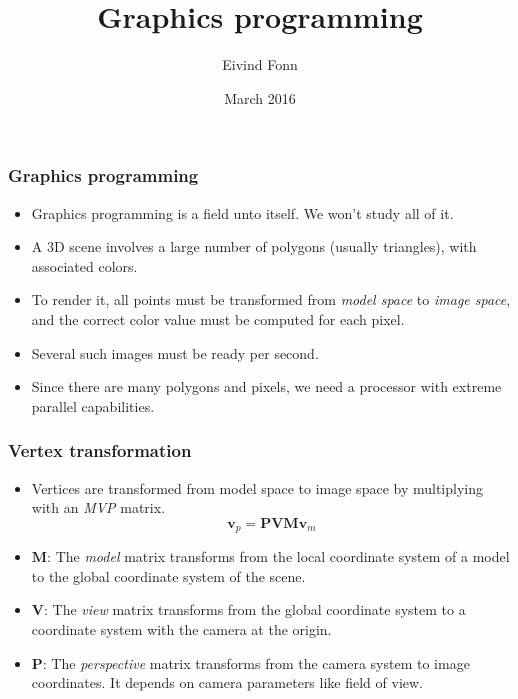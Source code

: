 

\title{Graphics programming}
\author{Eivind Fonn}
\date{March 2016}
\maketitle

\begin{frame}
  \frametitle{Graphics programming}
  \begin{itemize}
  \item Graphics programming is a field unto itself. We won't study all of it.
  \item A 3D scene involves a large number of polygons (usually triangles), with
    associated colors.
  \item To render it, all points must be transformed from \emph{model space} to
    \emph{image space}, and the correct color value must be computed for each
    pixel.
  \item Several such images must be ready per second.
  \item Since there are many polygons and pixels, we need a processor with
    extreme parallel capabilities.
  \end{itemize}
\end{frame}

\begin{frame}
  \frametitle{Vertex transformation}
  \begin{itemize}
  \item Vertices are transformed from model space to image space by multiplying
    with an \emph{MVP} matrix.
    \[
      \bm v_p = \bm P \bm V \bm M \bm v_m
    \]
  \item $\bm M$: The \emph{model} matrix transforms from the local coordinate
    system of a model to the global coordinate system of the scene.
  \item $\bm V$: The \emph{view} matrix transforms from the global coordinate
    system to a coordinate system with the camera at the origin.
  \item $\bm P$: The \emph{perspective} matrix transforms from the camera system
    to image coordinates. It depends on camera parameters like field of view.
  \end{itemize}
\end{frame}


